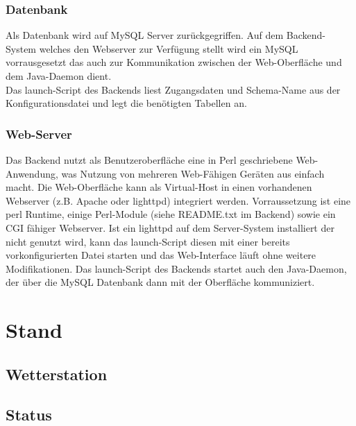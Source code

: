 \documentclass[12pt,a4paper]{article}
\begin{document}
\subsubsection{Datenbank}
Als Datenbank wird auf MySQL Server zurückgegriffen. Auf dem Backend-System welches den Webserver zur Verfügung stellt wird ein MySQL vorrausgesetzt das auch zur Kommunikation zwischen der Web-Oberfläche und dem Java-Daemon dient. \\
Das launch-Script des Backends liest Zugangsdaten und Schema-Name aus der Konfigurationsdatei und legt die benötigten Tabellen an.

\subsubsection{Web-Server}
Das Backend nutzt als Benutzeroberfläche eine in Perl geschriebene Web-Anwendung, was Nutzung von mehreren Web-Fähigen Geräten aus einfach macht. Die Web-Oberfläche kann als Virtual-Host in einen vorhandenen Webserver (z.B. Apache oder lighttpd) integriert werden. Vorraussetzung ist eine perl Runtime, einige Perl-Module (siehe README.txt im Backend) sowie ein CGI fähiger Webserver. Ist ein lighttpd auf dem Server-System installiert der nicht genutzt wird, kann das launch-Script diesen mit einer bereits vorkonfigurierten Datei starten und das Web-Interface läuft ohne weitere Modifikationen.
Das launch-Script des Backends startet auch den Java-Daemon, der über die MySQL Datenbank dann mit der Oberfläche kommuniziert.
\section{Stand}
\subsection{Wetterstation}
\subsection{Status}
\end{document}
